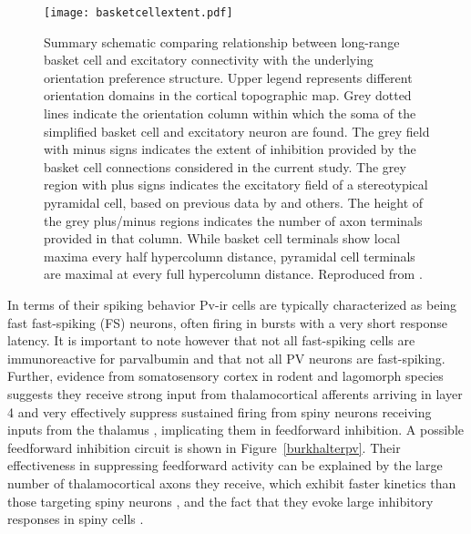 \begin{figure}
	\centering
        \texttt{[image: basketcellextent.pdf]}
	\caption[Schematic representing the proposed spatial distribution
      of pyramidal and basket cell extents and their relationship to
      the orientation map in V1. Reproduced from
      \cite{Buzas2001}.]{Summary schematic comparing relationship
      between long-range basket cell and excitatory connectivity with
      the underlying orientation preference structure. Upper legend
      represents different orientation domains in the cortical
      topographic map. Grey dotted lines indicate the orientation
      column within which the soma of the simplified basket cell and
      excitatory neuron are found. The grey field with minus signs
      indicates the extent of inhibition provided by the basket cell
      connections considered in the current study. The grey region
      with plus signs indicates the excitatory field of a
      stereotypical pyramidal cell, based on previous data by
      \cite{Bosking1997,Kisvarday1997a} and others. The height of the
      grey plus/minus regions indicates the number of axon terminals
      provided in that column. While basket cell terminals show local
      maxima every half hypercolumn distance, pyramidal cell terminals
      are maximal at every full hypercolumn distance. Reproduced from
      \cite{Buzas2001}.}
	\label{BasketCellExtent}
\end{figure}

In terms of their spiking behavior Pv-ir cells are typically
characterized as being fast fast-spiking (FS) neurons, often firing in
bursts with a very short response latency. It is important to note
however that not all fast-spiking cells are immunoreactive for
parvalbumin and that not all PV neurons are fast-spiking. Further,
evidence from somatosensory cortex in rodent and lagomorph species
suggests they receive strong input from thalamocortical afferents
arriving in layer 4 and very effectively suppress sustained firing
from spiny neurons receiving inputs from the thalamus
\citep{Swadlow2003}, implicating them in feedforward inhibition. A
possible feedforward inhibition circuit is shown in
Figure~\ref{burkhalterpv}. Their effectiveness in suppressing
feedforward activity can be explained by the large number of
thalamocortical axons they receive, which exhibit faster kinetics than
those targeting spiny neurons \citep{Cruikshank2007,Gabernet2005}, and
the fact that they evoke large inhibitory responses in spiny cells
\citep{Cruikshank2007,Gabernet2005}.

